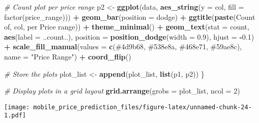 \documentclass[
]{article}
\newenvironment{Shaded}{\begin{snugshade}}{\end{snugshade}}
\newcommand{\AttributeTok}[1]{\textcolor[rgb]{0.13,0.29,0.53}{#1}}
\newcommand{\CommentTok}[1]{\textcolor[rgb]{0.56,0.35,0.01}{\textit{#1}}}
\newcommand{\DecValTok}[1]{\textcolor[rgb]{0.00,0.00,0.81}{#1}}
\newcommand{\FloatTok}[1]{\textcolor[rgb]{0.00,0.00,0.81}{#1}}
\newcommand{\FunctionTok}[1]{\textcolor[rgb]{0.13,0.29,0.53}{\textbf{#1}}}
\newcommand{\NormalTok}[1]{#1}
\newcommand{\OtherTok}[1]{\textcolor[rgb]{0.56,0.35,0.01}{#1}}
\newcommand{\SpecialCharTok}[1]{\textcolor[rgb]{0.81,0.36,0.00}{\textbf{#1}}}
\newcommand{\StringTok}[1]{\textcolor[rgb]{0.31,0.60,0.02}{#1}}
\begin{document}
\begin{Shaded}
\begin{Highlighting}[]
  \CommentTok{\# Count plot per price range}
\NormalTok{  p2 }\OtherTok{\textless{}{-}} \FunctionTok{ggplot}\NormalTok{(data, }\FunctionTok{aes\_string}\NormalTok{(}\AttributeTok{y =}\NormalTok{ col, }\AttributeTok{fill =} \StringTok{\textquotesingle{}factor(price\_range)\textquotesingle{}}\NormalTok{)) }\SpecialCharTok{+}
    \FunctionTok{geom\_bar}\NormalTok{(}\AttributeTok{position =} \StringTok{\textquotesingle{}dodge\textquotesingle{}}\NormalTok{) }\SpecialCharTok{+}
    \FunctionTok{ggtitle}\NormalTok{(}\FunctionTok{paste}\NormalTok{(}\StringTok{\textquotesingle{}Count of\textquotesingle{}}\NormalTok{, col, }\StringTok{\textquotesingle{}per Price range\textquotesingle{}}\NormalTok{)) }\SpecialCharTok{+}
    \FunctionTok{theme\_minimal}\NormalTok{() }\SpecialCharTok{+}
    \FunctionTok{geom\_text}\NormalTok{(}\AttributeTok{stat =} \StringTok{\textquotesingle{}count\textquotesingle{}}\NormalTok{, }\FunctionTok{aes}\NormalTok{(}\AttributeTok{label =}\NormalTok{ ..count..), }\AttributeTok{position =} \FunctionTok{position\_dodge}\NormalTok{(}\AttributeTok{width =} \FloatTok{0.9}\NormalTok{), }\AttributeTok{hjust =} \SpecialCharTok{{-}}\FloatTok{0.1}\NormalTok{) }\SpecialCharTok{+}
    \FunctionTok{scale\_fill\_manual}\NormalTok{(}\AttributeTok{values =} \FunctionTok{c}\NormalTok{(}\StringTok{\textquotesingle{}\#4d9b68\textquotesingle{}}\NormalTok{, }\StringTok{\textquotesingle{}\#538e8a\textquotesingle{}}\NormalTok{, }\StringTok{\textquotesingle{}\#468e71\textquotesingle{}}\NormalTok{, }\StringTok{\textquotesingle{}\#59ae8c\textquotesingle{}}\NormalTok{), }\AttributeTok{name =} \StringTok{"Price Range"}\NormalTok{) }\SpecialCharTok{+}
    \FunctionTok{coord\_flip}\NormalTok{()}
  
  \CommentTok{\# Store the plots}
\NormalTok{  plot\_list }\OtherTok{\textless{}{-}} \FunctionTok{append}\NormalTok{(plot\_list, }\FunctionTok{list}\NormalTok{(p1, p2))}
\NormalTok{\}}

\CommentTok{\# Display plots in a grid layout}
\FunctionTok{grid.arrange}\NormalTok{(}\AttributeTok{grobs =}\NormalTok{ plot\_list, }\AttributeTok{ncol =} \DecValTok{2}\NormalTok{)}
\end{Highlighting}
\end{Shaded}

\texttt{[image: mobile\_price\_prediction\_files/figure-latex/unnamed-chunk-24-1.pdf]}
\end{document}
